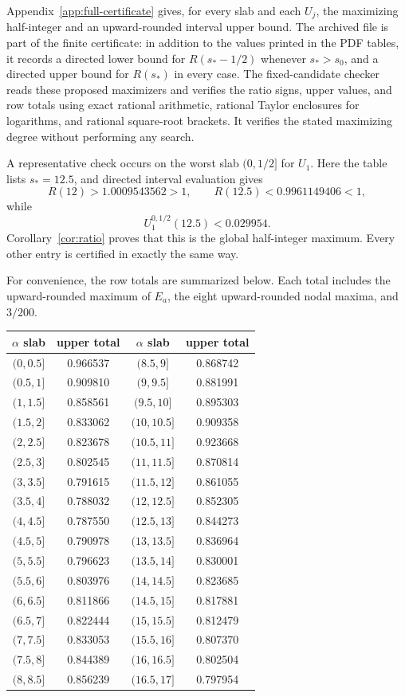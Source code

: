 \documentclass[11pt]{amsart}
\theoremstyle{definition}
\begin{document}
Appendix~\ref{app:full-certificate} gives, for every slab and each $U_j$, the maximizing half-integer and an upward-rounded interval upper bound.  The archived file  is part of the finite certificate: in addition to the values printed in the PDF tables, it records a directed lower bound for $R(s_\ast-1/2)$ whenever $s_\ast>s_0$, and a directed upper bound for $R(s_\ast)$ in every case.  The fixed-candidate checker  reads these proposed maximizers and verifies the ratio signs, upper values, and row totals using exact rational arithmetic, rational Taylor enclosures for logarithms, and rational square-root brackets.  It verifies the stated maximizing degree without performing any search.

A representative check occurs on the worst slab $(0,1/2]$ for $U_1$.  Here the table lists $s_\ast=12.5$, and directed interval evaluation gives
\[
 R(12)>1.0009543562>1,
 \qquad
 R(12.5)<0.9961149406<1,
\]
while
\[
 U_1^{0,1/2}(12.5)<0.029954.
\]
Corollary~\ref{cor:ratio} proves that this is the global half-integer maximum.  Every other entry is certified in exactly the same way.

For convenience, the row totals are summarized below.  Each total includes the upward-rounded maximum of $E_a$, the eight upward-rounded nodal maxima, and $3/200$.

\begin{center}
\small
\begin{tabular}{cc@{\qquad\qquad}cc}
\toprule
$\alpha$ slab & upper total & $\alpha$ slab & upper total\\
\midrule
$(0,0.5]$ & 0.966537 & $(8.5,9]$ & 0.868742 \\
$(0.5,1]$ & 0.909810 & $(9,9.5]$ & 0.881991 \\
$(1,1.5]$ & 0.858561 & $(9.5,10]$ & 0.895303 \\
$(1.5,2]$ & 0.833062 & $(10,10.5]$ & 0.909358 \\
$(2,2.5]$ & 0.823678 & $(10.5,11]$ & 0.923668 \\
$(2.5,3]$ & 0.802545 & $(11,11.5]$ & 0.870814 \\
$(3,3.5]$ & 0.791615 & $(11.5,12]$ & 0.861055 \\
$(3.5,4]$ & 0.788032 & $(12,12.5]$ & 0.852305 \\
$(4,4.5]$ & 0.787550 & $(12.5,13]$ & 0.844273 \\
$(4.5,5]$ & 0.790978 & $(13,13.5]$ & 0.836964 \\
$(5,5.5]$ & 0.796623 & $(13.5,14]$ & 0.830001 \\
$(5.5,6]$ & 0.803976 & $(14,14.5]$ & 0.823685 \\
$(6,6.5]$ & 0.811866 & $(14.5,15]$ & 0.817881 \\
$(6.5,7]$ & 0.822444 & $(15,15.5]$ & 0.812479 \\
$(7,7.5]$ & 0.833053 & $(15.5,16]$ & 0.807370 \\
$(7.5,8]$ & 0.844389 & $(16,16.5]$ & 0.802504 \\
$(8,8.5]$ & 0.856239 & $(16.5,17]$ & 0.797954 \\
\bottomrule
\end{tabular}
\end{center}
\end{document}
